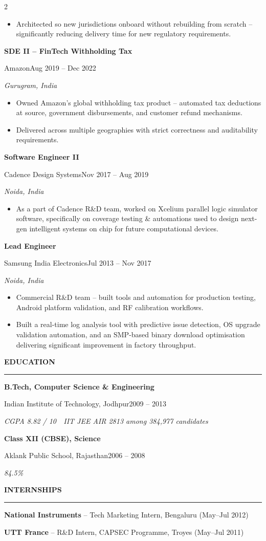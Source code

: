 \documentclass[10pt,a4paper]{article}
\newcommand{\cvsection}[1]{%
  \vspace{8pt}%
  {\normalsize\bfseries\color{textdark}\MakeUppercase{#1}}\par
  \vspace{1pt}%
  {\color{accent}\rule{\linewidth}{1pt}}\par
  \vspace{3pt}%
}
\newcommand{\role}[4]{%
  {\bfseries\color{textdark}#1}\par
  {\color{accent}\small #2}\hfill{\color{textmuted}\small #4}\par
  {\color{textlight}\small\itshape #3}\par\vspace{2pt}
}
\newcommand{\edublock}[4]{%
  {\bfseries\color{textdark}#1}\par
  {\color{accent}\small #2}\hfill{\color{textmuted}\small #4}\par
  {\color{textlight}\small\itshape #3}\par\vspace{2pt}
}
\begin{document}
\begin{paracol}{2}
\begin{itemize}
        enabling automated regulatory filings across multiple countries.
  \item Architected so new jurisdictions onboard without rebuilding from scratch --
        significantly reducing delivery time for new regulatory requirements.
\end{itemize}
\role{SDE II -- FinTech Withholding Tax}{Amazon}{Gurugram, India}{Aug 2019 -- Dec 2022}
\begin{itemize}
  \item Owned Amazon's global withholding tax product -- automated tax deductions
        at source, government disbursements, and customer refund mechanisms.
  \item Delivered across multiple geographies with strict correctness and
        auditability requirements.
\end{itemize}
\role{Software Engineer II}{Cadence Design Systems}{Noida, India}{Nov 2017 -- Aug 2019}
\begin{itemize}
  \item As a part of Cadence R\&D team, worked on Xcelium parallel logic simulator
        software, specifically on coverage testing \& automations used to design
        next-gen intelligent systems on chip for future computational devices.
\end{itemize}
\role{Lead Engineer}{Samsung India Electronics}{Noida, India}{Jul 2013 -- Nov 2017}
\begin{itemize}
  \item Commercial R\&D team -- built tools and automation for production testing,
        Android platform validation, and RF calibration workflows.
  \item Built a real-time log analysis tool with predictive issue detection, OS
        upgrade validation automation, and an SMP-based binary download
        optimisation delivering significant improvement in factory throughput.
\end{itemize}
\cvsection{Education}
\edublock{B.Tech, Computer Science \& Engineering}{Indian Institute of Technology, Jodhpur}{CGPA 8.82 / 10~\textperiodcentered~IIT JEE AIR 2813 among 384{,}977 candidates}{2009 -- 2013}
\edublock{Class XII (CBSE), Science}{Aklank Public School, Rajasthan}{84.5\%}{2006 -- 2008}
\cvsection{Internships}
\small
\textbf{National Instruments} -- Tech Marketing Intern, Bengaluru (May--Jul 2012)\par\vspace{1pt}
\textbf{UTT France} -- R\&D Intern, CAPSEC Programme, Troyes (May--Jul 2011)

\end{paracol}
\end{document}
